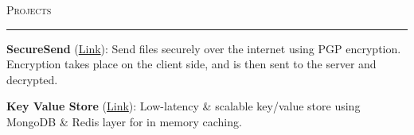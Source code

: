 \documentclass[a4paper, 12pt]{article}
\begin{document}


\Large{\textsc{Projects}}\vspace{-0.5cm}\newline
\rule{19cm}{0.01cm}
\vspace{0.2cm}
\newline
\large
\textbf{SecureSend} (\href{https://github.com/IamRaviTejaG/SecureSend}{\color{veronica}Link}): Send files securely over the internet using PGP encryption. Encryption takes place on the client side, and is then sent to the server and decrypted.\newline\vspace{-0.5cm}

\textbf{Key Value Store} (\href{https://github.com/IamRaviTejaG/kv-store-redis-node}{\color{veronica}Link}): Low-latency \& scalable key/value store using MongoDB \& Redis layer for in memory caching.\newline\vspace{-0.5cm}
\end{document}
